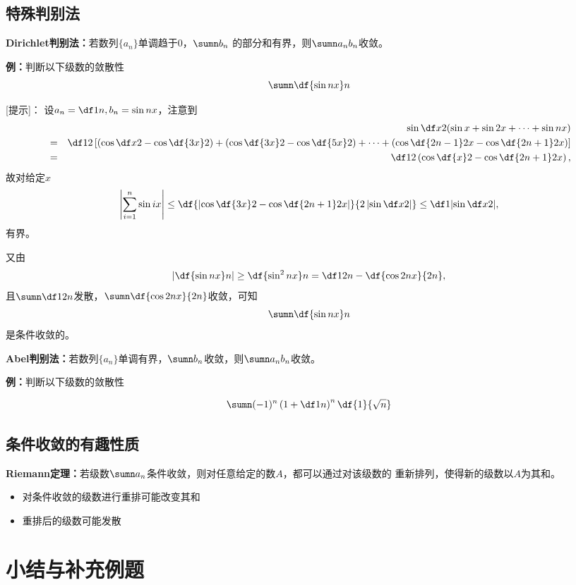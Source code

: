 \begin{shaded}

\subsection{特殊判别法}

{\bf Dirichlet判别法：}若数列$\{a_n\}$单调趋于$0$，$\sumn b_n$
  的部分和有界，则$\sumn a_nb_n$收敛。
  
{\bf 例：}判断以下级数的敛散性
$$\sumn\df{\sin nx}n$$

[提示]：
设$a_n=\df1n,b_n=\sin nx$，注意到
\begin{eqnarray*}
&&\sin\df x2(\sin x+\sin2x+\cdots+\sin nx)\\
&=&\df12\left[\left(\cos\df x2-\cos\df{3x}2\right)+
\left(\cos\df {3x}2-\cos\df{5x}2\right)+\cdots+
\left(\cos\df {2n-1}2x-\cos\df{2n+1}2x\right)\right]\\
&=&\df12\left(\cos\df{x}2-\cos\df{2n+1}2x\right),
\end{eqnarray*}
故对给定$x$
$$\left|\sum\limits_{i=1}^n\sin ix\right|
\leq\df{\left|\cos\df{3x}2-\cos\df{2n+1}2x\right|}{2\left|\sin\df x2\right|}
\leq\df1{\left|\sin\df x2\right|},$$
有界。

又由
$$\left|\df{\sin nx}n\right|\geq\df{\sin^2nx}n=\df1{2n}-\df{\cos2nx}{2n},$$
且$\sumn\df1{2n}$发散，$\sumn\df{\cos2nx}{2n}$收敛，可知
$$\sumn\df{\sin nx}n$$是条件收敛的。

{\bf Abel判别法：}若数列$\{a_n\}$单调有界，$\sumn b_n$收敛，则$\sumn a_nb_n$收敛。

{\bf 例：}判断以下级数的敛散性

$$\sumn(-1)^n\left(1+\df 1n\right)^n\df{1}{\sqrt n}$$ 

\subsection{条件收敛的有趣性质}

{\bf Riemann定理：}若级数$\sumn a_n$条件收敛，则对任意给定的数$A$，都可以通过对该级数的
重新排列，使得新的级数以$A$为其和。

\begin{itemize}
  \item 对条件收敛的级数进行重排可能改变其和
  \item 重排后的级数可能发散
\end{itemize}

\end{shaded}

\section*{小结与补充例题}

